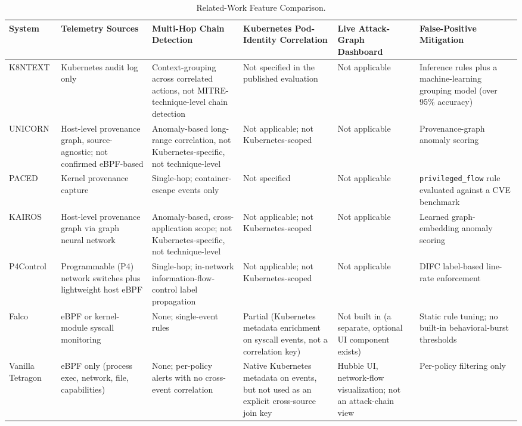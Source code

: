 \documentclass{ieeeaccess}
\renewcommand{\arraystretch}{0.95}
\begin{document}
\begin{table}[!t]
\centering
\caption{Related-Work Feature Comparison.}
\label{tab:related-work}
\setlength{\tabcolsep}{3pt}
\tablebodyfont
\renewcommand{\arraystretch}{1.05}
\begin{tabular}{@{}>{\raggedright\arraybackslash}p{}>{\raggedright\arraybackslash}p{}>{\raggedright\arraybackslash}p{}>{\raggedright\arraybackslash}p{}>{\raggedright\arraybackslash}p{}>{\raggedright\arraybackslash}p{}@{}}
\toprule
\textbf{System} & \textbf{Telemetry Sources} & \textbf{Multi-Hop Chain Detection} & \textbf{Kubernetes Pod-Identity Correlation} & \textbf{Live Attack-Graph Dashboard} & \textbf{False-Positive Mitigation} \\
\midrule
K8NTEXT & Kubernetes audit log only & Context-grouping across correlated actions, not MITRE-technique-level chain detection & Not specified in the published evaluation & Not applicable & Inference rules plus a machine-learning grouping model (over 95\% accuracy) \\
UNICORN & Host-level provenance graph, source-agnostic; not confirmed eBPF-based & Anomaly-based long-range correlation, not Kubernetes-specific, not technique-level & Not applicable; not Kubernetes-scoped & Not applicable & Provenance-graph anomaly scoring \\
PACED & Kernel provenance capture & Single-hop; container-escape events only & Not specified & Not applicable & \texttt{privileged\_flow} rule evaluated against a CVE benchmark \\
KAIROS & Host-level provenance graph via graph neural network & Anomaly-based, cross-application scope; not Kubernetes-specific, not technique-level & Not applicable; not Kubernetes-scoped & Not applicable & Learned graph-embedding anomaly scoring \\
P4Control & Programmable (P4) network switches plus lightweight host eBPF & Single-hop; in-network information-flow-control label propagation & Not applicable; not Kubernetes-scoped & Not applicable & DIFC label-based line-rate enforcement \\
Falco & eBPF or kernel-module syscall monitoring & None; single-event rules & Partial (Kubernetes metadata enrichment on syscall events, not a correlation key) & Not built in (a separate, optional UI component exists) & Static rule tuning; no built-in behavioral-burst thresholds \\
Vanilla Tetragon & eBPF only (process exec, network, file, capabilities) & None; per-policy alerts with no cross-event correlation & Native Kubernetes metadata on events, but not used as an explicit cross-source join key & Hubble UI, network-flow visualization; not an attack-chain view & Per-policy filtering only \\

\end{tabular}
\end{table}
\end{document}
